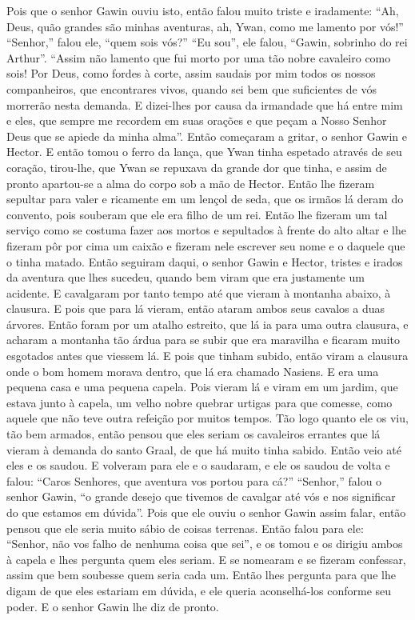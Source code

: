 Pois que o senhor Gawin ouviu isto, então falou muito triste e iradamente: “Ah,
Deus, quão grandes são minhas aventuras, ah, Ywan, como me lamento por vós!”
“Senhor,” falou ele, “quem sois vós?” “Eu sou”, ele falou, “Gawin, sobrinho do
rei Arthur”. “Assim não lamento que fui morto por uma tão nobre cavaleiro como
sois! Por Deus, como fordes à corte, assim saudais por mim todos os nossos
companheiros, que encontrares vivos, quando sei bem que suficientes de vós
morrerão nesta demanda. E dizei-lhes por causa da irmandade que há entre mim e
eles, que sempre me recordem em suas orações e que peçam a Nosso Senhor Deus
que se apiede da minha alma”. Então começaram a gritar, o senhor Gawin e
Hector. E então tomou o ferro da lança, que Ywan tinha espetado através de seu
coração, tirou-lhe, que Ywan se repuxava da grande dor que tinha, e assim de
pronto apartou-se a alma do corpo sob a mão de Hector. Então lhe fizeram
sepultar para valer e ricamente em um lençol de seda, que os irmãos lá deram do
convento, pois souberam que ele era filho de um rei. Então lhe fizeram
um tal serviço como se costuma fazer aos mortos e sepultados à frente do alto
altar e lhe fizeram pôr por cima um caixão e fizeram nele escrever seu nome e o
daquele que o tinha matado. Então seguiram daqui, o senhor Gawin e Hector,
tristes e irados da aventura que lhes sucedeu, quando bem viram que era
justamente um acidente. E cavalgaram por tanto tempo até que vieram à montanha
abaixo, à clausura. E pois que para lá vieram, então ataram ambos seus cavalos
a duas árvores. Então foram por um atalho estreito, que lá ia para uma outra
clausura, e acharam a montanha tão árdua para se subir que era maravilha e
ficaram muito esgotados antes que viessem lá. E pois que tinham subido, então
viram a clausura onde o bom homem morava dentro, que lá era chamado Nasiens. E
era uma pequena casa e uma pequena capela. Pois vieram lá e viram em um jardim,
que estava junto à capela, um velho nobre quebrar urtigas para que comesse,
como aquele que não teve outra refeição por muitos tempos. Tão logo quanto ele
os viu, tão bem armados, então pensou que eles seriam os cavaleiros errantes
que lá vieram à demanda do santo Graal, de que há muito tinha sabido. Então
veio até eles e os saudou. E volveram para ele e o saudaram, e ele os saudou de
volta e falou: “Caros Senhores, que aventura vos portou para cá?” “Senhor,”
falou o senhor Gawin, “o grande desejo que tivemos de cavalgar até vós e nos
significar do que estamos em dúvida”. Pois que ele ouviu o senhor Gawin assim
falar, então pensou que ele seria muito sábio de coisas terrenas. Então falou
para ele: “Senhor, não vos falho de nenhuma coisa que sei”, e os tomou e os
dirigiu ambos à capela e lhes pergunta quem eles seriam. E se nomearam e se
fizeram confessar, assim que bem soubesse quem seria cada um. Então lhes
pergunta para que lhe digam de que eles estariam em dúvida, e ele queria
aconselhá-los conforme seu poder. E o senhor Gawin lhe diz de pronto.

